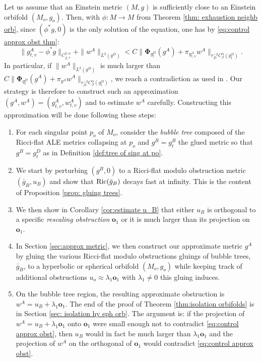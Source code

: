 \documentclass[11pt,reqno]{amsart}
\numberwithin{equation}{section}
\newcommand{\Ric}{{\rm Ric}}
\theoremstyle{definition}
\theoremstyle{remark}
\begin{document}
Let us assume that an Einstein metric $(M,g)$ is sufficiently close to an Einstein orbifold $(M_o,g_o)$. Then, with $\phi:M\to M$ from Theorem \ref{thm: exhaustion neighb orb}, since $(\phi^*g , 0)$ is the only solution of the equation, one has by  \eqref{eq:control approx obst thm}:
\begin{equation}\label{eq:control approx obst}
    \|g^A_{t ,v }-\phi ^*g \|_{C^{2,\alpha}_{\beta,*}} + \|w^A\|_{L^2(g^D)} < C \big\|\mathbf{\Phi}_{g^D_{t }}(g^A) + \pi_{g^A_{t,v}}w^A \big\|_{r_D^{-2}C^\alpha_{\beta}(g^D_{t })}.
\end{equation}
In particular, if $\|w^A\|_{L^2(g^D)}$ is much larger than $C\big\|\mathbf{\Phi}_{g^D_{t }}(g^A) +\pi_{g^A} w^A \big\|_{r_D^{-2}C^\alpha_{\beta}(g^D_{t })}$, we reach a contradiction as used in \cite[Section 5.3]{ozu2}. Our strategy is therefore to construct such an approximation $(g^A,w^A)=(g^A_{t ,v },w^A_{t ,v })$ and to estimate $w^A$ carefully. Constructing this approximation will be done following these steps:
\begin{enumerate}
    \item For each singular point $p_o$ of $M_o$, consider the \textit{bubble tree} composed of the Ricci-flat ALE metrics collapsing at $p_o$ and $g^B=g^B_{t }$ the glued metric so that $g^B = g^D_{t }$ as in Definition \ref{def:tree of sing at po}. 
    
    \item We start by perturbing $(g^B,0)$ to a Ricci-flat modulo obstruction metric $(\bar{g}_B,u_B)$ and show that $\Ric(\bar{g}_B)$ decays fast at infinity.  This is the content of Proposition \ref{prop: gluing trees}.
    \item We then show in Corollary \ref{cor:estimate u_B} that either $u_B$ is orthogonal to a specific \textit{rescaling obstruction} $\mathbf{o}_1$ or it is much larger than its projection on $\mathbf{o}_1$.  
    \item In Section \ref{sec:approx metric}, we then construct our approximate metric $g^A$ by gluing the various Ricci-flat modulo obstructions gluings of bubble trees, $\bar{g}_B$, to a hyperbolic or spherical orbifold $(M_o,g_o)$ while keeping track of additional obstructions $u_o\approx \lambda_1\mathbf{o}_1$ with $\lambda_1\neq 0$ this gluing induces.  
    \item On the bubble tree region, the resulting approximate obstruction is $w^A = u_B + \lambda_1\mathbf{o}_1$. The end of the proof of Theorem \ref{thm:isolation orbifolds} is in Section \ref{sec: isolation hy sph orb}. The argument is: if the projection of $w^A = u_B+\lambda_1\mathbf{o}_1$ onto $\mathbf{o}_1$ were small enough not to contradict \eqref{eq:control approx obst}, then $u_B$ would in fact be much larger than $\lambda_1\mathbf{o}_1$ and the projection of $w^A$ on the orthogonal of $\mathbf{o}_1$ would contradict \eqref{eq:control approx obst}. 
\end{enumerate}
\end{document}
